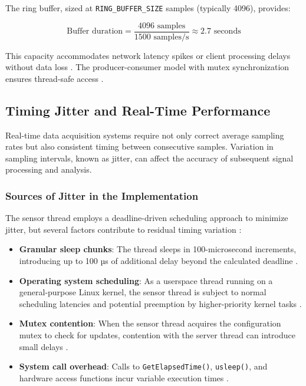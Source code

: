 The ring buffer, sized at \texttt{RING\_BUFFER\_SIZE} samples (typically 4096), provides:

\[
\text{Buffer duration} = \frac{4096 \text{ samples}}{1500 \text{ samples/s}} \approx 2.7 \text{ seconds}
\]

This capacity accommodates network latency spikes or client processing delays without data loss \cite{ringbuffer, ring_buffer_basics}. The producer-consumer model with mutex synchronization ensures thread-safe access \cite{llnl-pthreads, stackoverflow_producer_consumer}.

\subsection{Timing Jitter and Real-Time Performance}

Real-time data acquisition systems require not only correct average sampling rates but also consistent timing between consecutive samples. Variation in sampling intervals, known as jitter, can affect the accuracy of subsequent signal processing and analysis.

\subsubsection{Sources of Jitter in the Implementation}

The sensor thread employs a deadline-driven scheduling approach to minimize jitter, but several factors contribute to residual timing variation \cite{realtime}:

\begin{itemize}
    \item \textbf{Granular sleep chunks}: The thread sleeps in 100-microsecond increments, introducing up to 100 µs of additional delay beyond the calculated deadline \cite{apue}.
    \item \textbf{Operating system scheduling}: As a userspace thread running on a general-purpose Linux kernel, the sensor thread is subject to normal scheduling latencies and potential preemption by higher-priority kernel tasks \cite{llnl-pthreads}.
    \item \textbf{Mutex contention}: When the sensor thread acquires the configuration mutex to check for updates, contention with the server thread can introduce small delays \cite{posix-standard}.
    \item \textbf{System call overhead}: Calls to \texttt{GetElapsedTime()}, \texttt{usleep()}, and hardware access functions incur variable execution times \cite{clock_gettime_man}.
\end{itemize}

